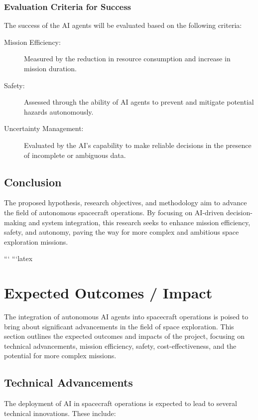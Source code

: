 \documentclass[a4paper, 11pt]{article}
\begin{document}
\subsubsection{Evaluation Criteria for Success}

The success of the AI agents will be evaluated based on the following criteria:

\begin{description}
    \item[Mission Efficiency:] Measured by the reduction in resource consumption and increase in mission duration.
    \item[Safety:] Assessed through the ability of AI agents to prevent and mitigate potential hazards autonomously.
    \item[Uncertainty Management:] Evaluated by the AI's capability to make reliable decisions in the presence of incomplete or ambiguous data.
\end{description}

\subsection{Conclusion}

The proposed hypothesis, research objectives, and methodology aim to advance the field of autonomous spacecraft operations. By focusing on AI-driven decision-making and system integration, this research seeks to enhance mission efficiency, safety, and autonomy, paving the way for more complex and ambitious space exploration missions.

```
```latex
\section{Expected Outcomes / Impact}

The integration of autonomous AI agents into spacecraft operations is poised to bring about significant advancements in the field of space exploration. This section outlines the expected outcomes and impacts of the project, focusing on technical advancements, mission efficiency, safety, cost-effectiveness, and the potential for more complex missions.

\subsection{Technical Advancements}

The deployment of AI in spacecraft operations is expected to lead to several technical innovations. These include:
\end{document}
